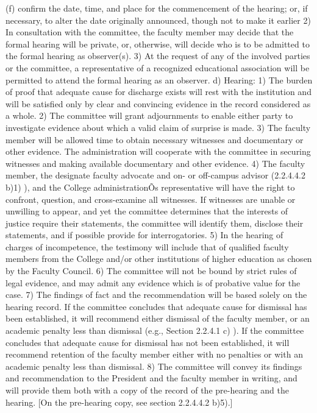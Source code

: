 \documentclass[letterpaper, 11pt]{article}
\begin{document}
				(f) confirm the date, time, and place for the commencement of the hearing; or, if necessary, to alter the date originally announced, though not to make it earlier
				2) In consultation with the committee, the faculty member may decide that the formal hearing will be private, or, otherwise, will decide who is to be admitted to the formal hearing as observer(s).
				3) At the request of any of the involved parties or the committee, a representative of a recognized educational association will be permitted to attend the formal hearing as an observer.
				d) Hearing:
				1) The burden of proof that adequate cause for discharge exists will rest with the institution and will be satisfied only by clear and convincing evidence in the record considered as a whole.
				2) The committee will grant adjournments to enable either party to investigate evidence about which a valid claim of surprise is made.
				3) The faculty member will be allowed time to obtain necessary witnesses and documentary or other evidence.  The administration will cooperate with the committee in securing witnesses and making available documentary and other evidence.
				4) The faculty member, the designate faculty advocate and on- or off-campus advisor (2.2.4.4.2  b)1) ), and the College administrationÕs representative will have the right to confront, question, and cross-examine all witnesses.  If witnesses are unable or unwilling to appear, and yet the committee determines that the interests of justice require their statements, the committee will identify them, disclose their statements, and if possible provide for interrogatories.
				5) In the hearing of charges of incompetence, the testimony will include that of qualified faculty members from the College and/or other institutions of higher education as chosen by the Faculty Council.
				6) The committee will not be bound by strict rules of legal evidence, and may admit any evidence which is of probative value for the case.
				7) The findings of fact and the recommendation will be based solely on the hearing record.
				If the committee concludes that adequate cause for dismissal has been established, it will recommend either dismissal of the faculty member, or an academic penalty less than dismissal (e.g., Section 2.2.4.1 c) ).  If the committee concludes that adequate cause for dismissal has not been established, it will recommend retention of the faculty member either with no penalties or with an academic penalty less than dismissal.
				8) The committee will convey its findings and recommendation to the President and the faculty member in writing, and will provide them both with a copy of the record of the pre-hearing and the hearing.  [On the pre-hearing copy, see section 2.2.4.4.2 b)5).]
\end{document}
